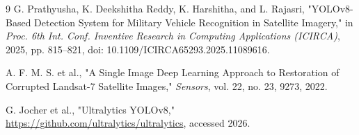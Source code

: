 \documentclass[11pt]{article}
\begin{document}
\begin{thebibliography}{9}
G. Prathyusha, K. Deekshitha Reddy, K. Harshitha, and L. Rajasri,
"YOLOv8-Based Detection System for Military Vehicle Recognition in Satellite Imagery,"
in \emph{Proc. 6th Int. Conf. Inventive Research in Computing Applications (ICIRCA)}, 2025, pp. 815--821, doi: 10.1109/ICIRCA65293.2025.11089616.

A. F. M. S. et al.,
"A Single Image Deep Learning Approach to Restoration of Corrupted Landsat-7 Satellite Images,"
\emph{Sensors}, vol. 22, no. 23, 9273, 2022.

G. Jocher et al.,
"Ultralytics YOLOv8," \url{https://github.com/ultralytics/ultralytics}, accessed 2026.
\end{thebibliography}
\end{document}
